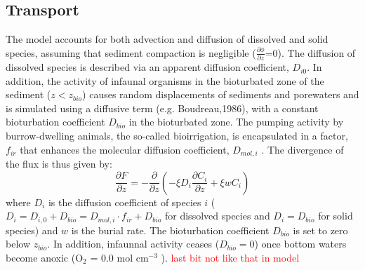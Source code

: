 \documentclass[gmd, manuscript]{copernicus}
\begin{document}
\subsection{Transport}
The model accounts for both advection and diffusion of dissolved and solid species, assuming that sediment compaction is negligible ($\frac{\partial \phi}{\partial z}$=0). 
The diffusion of dissolved species is described via an apparent diffusion coefficient, $D_{i0}$. In addition, the activity of infaunal organisms in the bioturbated zone of the sediment ($z<z_{bio}$) causes random 
displacements of sediments and porewaters and is simulated using a diffusive term (e.g. Boudreau,1986), with a constant bioturbation coefficient $D_{bio}$ in the bioturbated zone. 
The pumping activity by burrow-dwelling animals, the so-called bioirrigation, is encapsulated in a factor, $f_{ir}$ that enhances the molecular diffusion coefficient, 
$D_{mol,i}$ \citep[ hence, $D_{i,0}=D_{mol,i}\cdot f_{ir}$,][]{soetaert1996dynamic}.  The divergence of the flux is thus given by:
\begin{equation}
\frac{\partial F}{\partial z}=-\frac{\partial}{\partial z}\left( -\xi D_i \frac{\partial C_i}{\partial z} +\xi w C_i\right) \label{Eq_flux_divergence}
\end{equation}
where $D_i$ is the diffusion coefficient of species $i$ ($D_i=D_{i,0}+D_{bio}=D_{mol,i}\cdot f_{ir}+D_{bio}$ for dissolved species and $D_i=D_{bio}$ for solid species) and $w$ is the burial rate. 
The bioturbation coefficient $D_{bio}$ is set to zero below $z_{bio}$. In addition, infaunnal activity ceases ($D_{bio}=0$) once bottom waters become anoxic (O$_2$ = 0.0 mol cm$^{-3}$ ). 
\textcolor{red}{last bit not like that in model}
\end{document}
